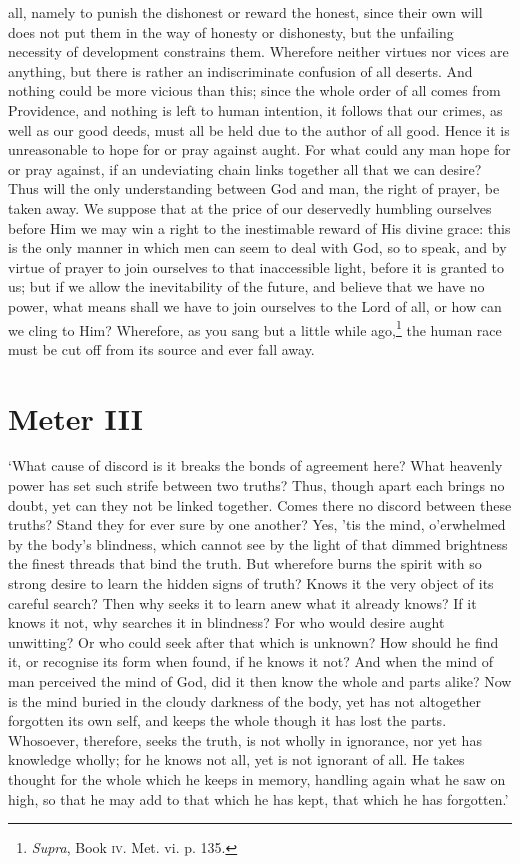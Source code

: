 all, namely to punish the dishonest or reward the honest, since their
own will does not put them in the way of  honesty or
dishonesty, but the unfailing necessity of development constrains
them. Wherefore neither virtues nor vices are anything, but there is
rather an indiscriminate confusion of all deserts. And nothing could
be more vicious than this; since the whole order of all comes from
Providence, and nothing is left to human intention, it follows that
our crimes, as well as our good deeds, must all be held due to the
author of all good. Hence it is unreasonable to hope for or pray
against aught. For what could any man hope for or pray against, if an
undeviating chain links together all that we can desire? Thus will
the only understanding between God and man, the right of prayer, be
taken away. We suppose that at the price of our deservedly humbling
ourselves before Him we may win a right to the inestimable reward of
His divine grace: this is the only manner in which men can seem to
deal with God, so to speak, and by virtue of prayer to join ourselves
to that inaccessible light, before it is granted to us; but if we
allow the inevitability of the future, and believe that we have no
power, what means shall we have to join ourselves to the Lord of all,
or how can we cling to Him? Wherefore, as you sang but a little while
ago,\footnote{\textit{Supra}, Book \textsc{iv}. Met. vi. p. 135.}
the human race must be cut off from its source and ever fall away.

\section{Meter III}

`What cause of discord is it breaks the  bonds of agreement
here? What heavenly power has set such strife between two truths?
Thus, though apart each brings no doubt, yet can they not be linked
together. Comes there no discord between these truths? Stand they for
ever sure by one another? Yes, 'tis the mind, o'erwhelmed by the
body's blindness, which cannot see by the light of that dimmed
brightness the finest threads that bind the truth. But wherefore burns
the spirit with so strong desire to learn the hidden signs of truth?
Knows it the very object of its careful search? Then why seeks it to
learn anew what it already knows? If it knows it not, why searches it
in blindness? For who would desire aught unwitting? Or who could seek
after that which is unknown? How should he find it, or recognise its
form when found, if he knows it not? And when the mind of man
perceived the mind of God, did it then know the whole and parts alike?
Now is the mind buried in the cloudy darkness of the body, yet has not
altogether forgotten its own self, and keeps the whole though it has
lost the parts. Whosoever, therefore, seeks the truth, is not wholly
in ignorance, nor yet has knowledge wholly; for he knows not all, yet
is not ignorant of all. He takes thought for the whole which he keeps
in memory, handling again what he saw on high, so that he may add to
that which he has kept, that which he has forgotten.'

